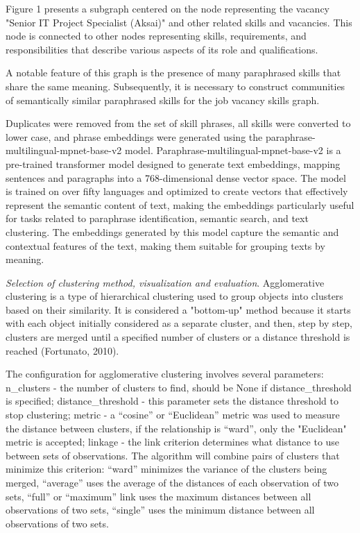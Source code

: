 \begin{multicols}{2}
Figure 1 presents a subgraph centered on the node representing the
vacancy "Senior IT Project Specialist (Aksai)" and other related skills
and vacancies. This node is connected to other nodes representing
skills, requirements, and responsibilities that describe various aspects
of its role and qualifications.

A notable feature of this graph is the presence of many paraphrased
skills that share the same meaning. Subsequently, it is necessary to
construct communities of semantically similar paraphrased skills for the
job vacancy skills graph.

Duplicates were removed from the set of skill phrases, all skills were
converted to lower case, and phrase embeddings were generated using the
paraphrase-multilingual-mpnet-base-v2 model.
Paraphrase-multilingual-mpnet-base-v2 is a pre-trained transformer model
designed to generate text embeddings, mapping sentences and paragraphs
into a 768-dimensional dense vector space. The model is trained on over
fifty languages and optimized to create vectors that effectively
represent the semantic content of text, making the embeddings
particularly useful for tasks related to paraphrase identification,
semantic search, and text clustering. The embeddings generated by this
model capture the semantic and contextual features of the text, making
them suitable for grouping texts by meaning.

\emph{Selection of clustering method, visualization and evaluation}.
Agglomerative clustering is a type of hierarchical clustering used to
group objects into clusters based on their similarity. It is considered
a "bottom-up" method because it starts with each object initially
considered as a separate cluster, and then, step by step, clusters are
merged until a specified number of clusters or a distance threshold is
reached (Fortunato, 2010).

The configuration for agglomerative clustering involves several
parameters: n\_clusters - the number of clusters to find, should be None
if distance\_threshold is specified; distance\_threshold - this
parameter sets the distance threshold to stop clustering; metric - a
``cosine'' or ``Euclidean'' metric was used to measure the distance
between clusters, if the relationship is ``ward'', only the "Euclidean"
metric is accepted; linkage - the link criterion determines what
distance to use between sets of observations. The algorithm will combine
pairs of clusters that minimize this criterion: ``ward'' minimizes the
variance of the clusters being merged, ``average'' uses the average of
the distances of each observation of two sets, ``full'' or ``maximum''
link uses the maximum distances between all observations of two sets,
``single'' uses the minimum distance between all observations of two
sets.


\end{multicols}
